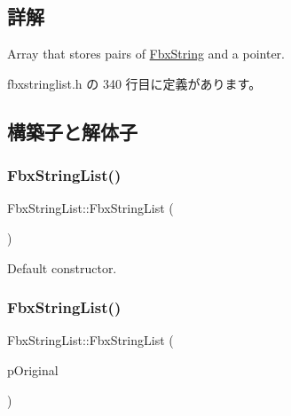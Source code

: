 \subsection{詳解}
Array that stores pairs of \hyperlink{class_fbx_string}{Fbx\+String} and a pointer. 

 fbxstringlist.\+h の 340 行目に定義があります。



\subsection{構築子と解体子}
\mbox{\label{class_fbx_string_list_a412df9e48bc17c5c1fdfbea296855196}} 
\subsubsection{\texorpdfstring{Fbx\+String\+List()}{FbxStringList()}\hspace{0.1cm}{\footnotesize\ttfamily [1/2]}}
{\footnotesize\ttfamily Fbx\+String\+List\+::\+Fbx\+String\+List (\begin{DoxyParamCaption}{ }\end{DoxyParamCaption})}



Default constructor. 

\mbox{\label{class_fbx_string_list_a2bf8796a8d075564468db9aa188b4f31}} 
\subsubsection{\texorpdfstring{Fbx\+String\+List()}{FbxStringList()}\hspace{0.1cm}{\footnotesize\ttfamily [2/2]}}
{\footnotesize\ttfamily Fbx\+String\+List\+::\+Fbx\+String\+List (\begin{DoxyParamCaption}\item[{const \hyperlink{class_fbx_string_list}{Fbx\+String\+List} \&}]{p\+Original }\end{DoxyParamCaption})}



